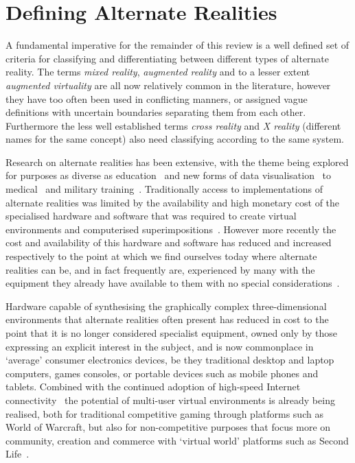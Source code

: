 
\section{Defining Alternate Realities}
A fundamental imperative for the remainder of this review is a well defined set of criteria for classifying and differentiating between different types of alternate reality. The terms \textit{mixed reality}, \textit{augmented reality} and to a lesser extent \textit{augmented virtuality} are all now relatively common in the literature, however they have too often been used in conflicting manners, or assigned vague definitions with uncertain boundaries separating them from each other. Furthermore the less well established terms \textit{cross reality} and \textit{X reality} (different names for the same concept) also need classifying according to the same system.



Research on alternate realities has been extensive, with the theme being explored for purposes as diverse as education~\cite{Warburton2009} and new forms of data visualisation~\cite{Coleman2009} to medical~\cite{TenEyck2011} and military training~\cite{Qiu2009}. Traditionally access to implementations of alternate realities was limited by the availability and high monetary cost of the specialised hardware and software that was required to create virtual environments and computerised superimpositions~\cite{Druck2006}. However more recently the cost and availability of this hardware and software has reduced and increased respectively to the point at which we find ourselves today where alternate realities can be, and in fact frequently are, experienced by many with the equipment they already have available to them with no special considerations~\cite{Sevan2008}.

Hardware capable of synthesising the graphically complex three-dimensional environments that alternate realities often present has reduced in cost to the point that it is no longer considered specialist equipment, owned only by those expressing an explicit interest in the subject, and is now commonplace in `average' consumer electronics devices, be they traditional desktop and laptop computers, games consoles, or portable devices such as mobile phones and tablets. Combined with the continued adoption of high-speed Internet connectivity~\cite{Cisco2011} the potential of multi-user virtual environments is already being realised, both for traditional competitive gaming through platforms such as World of Warcraft, but also for non-competitive purposes that focus more on community, creation and commerce with `virtual world' platforms such as Second Life~\cite{Sevan2008}.

